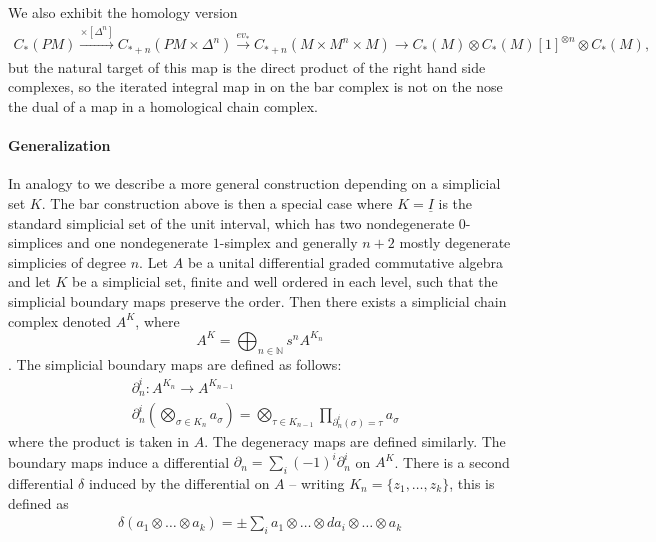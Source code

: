 \documentclass{scrartcl}
\theoremstyle{plain}
\theoremstyle{definition}
\newcommand{\N}{\mathbb N}
\let\xto\xrightarrow
\begin{document}
We also exhibit the homology version
\begin{align*}
    C_*(PM) \xto{\times [\Delta^n]} C_{*+n}(PM\times \Delta^n) \xto{ev_*} C_{*+n}(M\times M^n\times M)\to C_*(M)\otimes C_{*}(M)[1]^{\otimes n}\otimes C_*(M),
\end{align*}
but the natural target of this map is the direct product of the right hand side complexes, so the iterated integral map in on the bar complex is not on the nose the dual of a map in a homological chain complex.

\paragraph{Generalization}
In analogy to \cite[2.1]{patras2003cochain} we describe a more general construction depending on a simplicial set $K$. The bar construction above is then a special case where $K = \underline I$ is the standard simplicial set of the unit interval, which has two nondegenerate $0$-simplices and one nondegenerate $1$-simplex and generally $n+2$ mostly degenerate simplicies of degree $n$. Let $A$ be a unital differential graded commutative algebra and let $K$ be a simplicial set, finite and well ordered in each level, such that the simplicial boundary maps preserve the order. Then there exists a simplicial chain complex denoted $A^{K}$, where $$A^{K} = \bigoplus_{n\in\N} s^n A^{K_n}$$. The simplicial boundary maps are defined as follows: 
\begin{align*}
    &\partial_n^i\colon A^{K_n} \to A^{K_{n-1}}\\
    &\partial^i_n\left(\bigotimes_{\sigma\in K_n} a_\sigma\right) = \bigotimes_{\tau\in K_{n-1}} \prod_{\partial^i_n(\sigma) = \tau} a_\sigma
\end{align*}
where the product is taken in $A$. The degeneracy maps are defined similarly. The boundary maps induce a differential $\partial_n = \sum_i (-1)^i\partial_n^i$ on $A^{K}$. There is a second differential $\delta$ induced by the differential on $A$ -- writing $K_n = \{z_1, \dots, z_k\}$, this is defined as
\begin{align*}
    \delta(a_1\otimes\dots\otimes a_k) = \pm\sum_i a_1\otimes\dots\otimes da_i\otimes\dots\otimes a_k
\end{align*}
\end{document}
